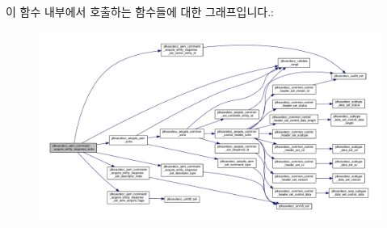 이 함수 내부에서 호출하는 함수들에 대한 그래프입니다.\+:
\nopagebreak
\begin{figure}[H]
\begin{center}
\leavevmode
\includegraphics[width=350pt]{group__command__acquire__entity__response_gaa1e4a5c3389e750f233c49481aaa443d_cgraph}
\end{center}
\end{figure}


